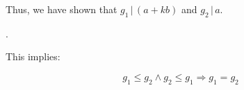 \begin{problem}
\begin{enumerate}
\begin{Answer}
Thus, we have shown that $g_{1}\, |\, (a + kb)$ and $g_{2}\, |\, a$.

.

This implies:

\begin{equation}
  g_{1} \le g_{2} \land g_{2} \le g_{1} \Rightarrow g_{1} = g_{2}
\end{equation}
\end{Answer}

\end{enumerate}

\end{problem}

